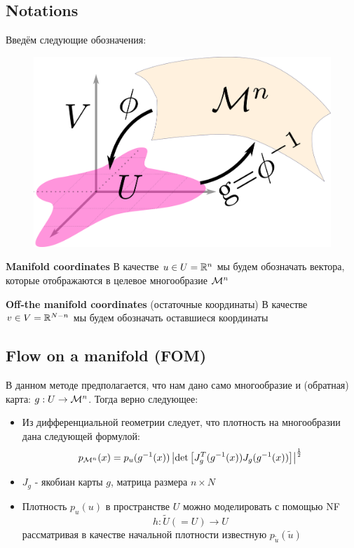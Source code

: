 \newpage

\subsection{Notations}

Введём следующие обозначения: 

\begin{figure}[h]
    \centering
    \includegraphics[width=0.4\linewidth]{chapters/petr_mokrov_s1/figs/notations4.png}
\end{figure}

\textbf{Manifold coordinates} В качестве $u \in U = \mathbb{R}^n$ мы будем обозначать вектора, которые отображаются в целевое многообразие $\mathcal{M}^n$

\textbf{Off-the manifold coordinates} (остаточные координаты) В качестве $v \in V = \mathbb{R}^{N - n}$ мы будем обозначать оставшиеся координаты

\subsection{Flow on a manifold (FOM)}

В данном методе предполагается, что нам дано само многообразие и (обратная) карта: $g: U \rightarrow \mathcal{M}^n$. Тогда верно следующее:

\begin{itemize}
    \item Из дифференциальной геометрии следует, что плотность на многообразии дана следующей формулой: 
    \begin{gather*}
        p_{\mathcal{M}^n}(x) = p_{u}(g^{-1}(x)) \left|\det \left[J_g^T(g^{-1}(x)) J_g(g^{-1}(x))\right]\right|^{\frac{1}{2}} 
    \end{gather*}
    \item $J_g$ - якобиан карты $g$, матрица размера $n \times N$
    \item Плотность $p_u(u)$ в пространстве $U$ можно моделировать с помощью NF $$h : \tilde{U} (= U) \rightarrow U$$ рассматривая в качестве начальной плотности известную $p_{\tilde{u}}(\tilde{u})$
\end{itemize}

